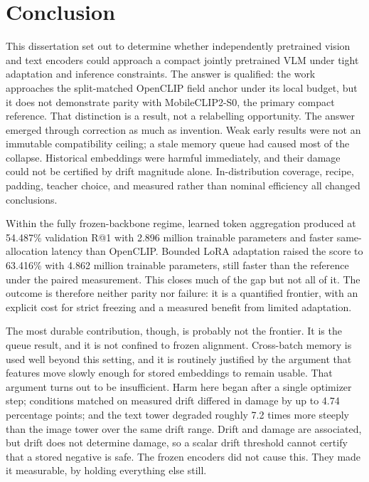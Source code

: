 \chapter{Conclusion}
This dissertation set out to determine whether independently pretrained vision and text encoders could approach a compact jointly pretrained VLM under tight adaptation and inference constraints. The answer is qualified: the work approaches the split-matched OpenCLIP field anchor under its local budget, but it does not demonstrate parity with MobileCLIP2-S0, the primary compact reference. That distinction is a result, not a relabelling opportunity. The answer emerged through correction as much as invention. Weak early results were not an immutable compatibility ceiling; a stale memory queue had caused most of the collapse. Historical embeddings were harmful immediately, and their damage could not be certified by drift magnitude alone. In-distribution coverage, recipe, padding, teacher choice, and measured rather than nominal efficiency all changed conclusions.

Within the fully frozen-backbone regime, learned token aggregation produced \MTone{} at 54.487\% validation R@1 with 2.896 million trainable parameters and faster same-allocation latency than OpenCLIP. Bounded LoRA adaptation raised the score to 63.416\% with 4.862 million trainable parameters, still faster than the reference under the paired measurement. This closes much of the gap but not all of it. The outcome is therefore neither parity nor failure: it is a quantified frontier, with an explicit cost for strict freezing and a measured benefit from limited adaptation.

The most durable contribution, though, is probably not the frontier. It is the queue result, and it is not confined to frozen alignment. Cross-batch memory is used well beyond this setting, and it is routinely justified by the argument that features move slowly enough for stored embeddings to remain usable. That argument turns out to be insufficient. Harm here began after a single optimizer step; conditions matched on measured drift differed in damage by up to 4.74 percentage points; and the text tower degraded roughly 7.2 times more steeply than the image tower over the same drift range. Drift and damage are associated, but drift does not determine damage, so a scalar drift threshold cannot certify that a stored negative is safe. The frozen encoders did not cause this. They made it measurable, by holding everything else still.

